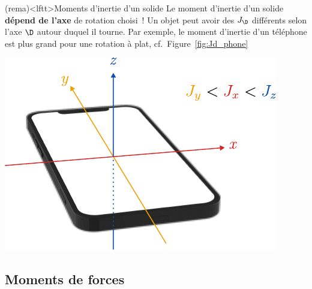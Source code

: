 \documentclass[../../main/main.tex]{subfiles}
\begin{document}
\begin{tcb*}[sidebyside, righthand ratio=.4](rema)<lftt>{Moments d'inertie d'un
			solide}
	Le moment d'inertie d'un solide \textbf{dépend de l'axe} de rotation choisi~!
	Un objet peut avoir des $J_{\D}$ différents selon l'axe $\D$ autour duquel il
	tourne.
	\smallbreak
	Par exemple, le moment d'inertie d'un téléphone est plus grand pour
	une rotation à plat, cf.\ Figure~\ref{fig:Jd_phone}
	\tcblower
	\begin{center}
		\includegraphics[width=\linewidth]{Jd_phone.pdf}
		\label{fig:Jd_phone}
	\end{center}
\end{tcb*}

\subsection{Moments de forces}
\end{document}
